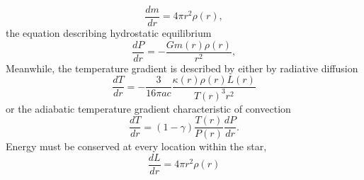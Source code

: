 \begin{equation}
    \frac{dm}{dr} = 4\pi r^2 \rho(r),
\end{equation}
the equation describing hydrostatic equilibrium
\begin{equation}
    \frac{dP}{dr} = -\frac{G m(r)\rho(r)}{r^2},
\end{equation}
Meanwhile, the temperature gradient is described by either by radiative diffusion
\begin{equation}
    \frac{dT}{dr} = -\frac{3}{16\pi ac}\frac{\kappa(r) \rho(r) L(r)}{T(r)^3 r^2}
\end{equation}
or the adiabatic temperature gradient characteristic of convection
\begin{equation}
    \frac{dT}{dr} = (1 - \gamma)\frac{T(r)}{P(r)}\frac{dP}{dr}.
\end{equation}
Energy must be conserved at every location within the star,
\begin{equation}
    \frac{dL}{dr} = 4\pi r^2 \rho(r)
\end{equation}